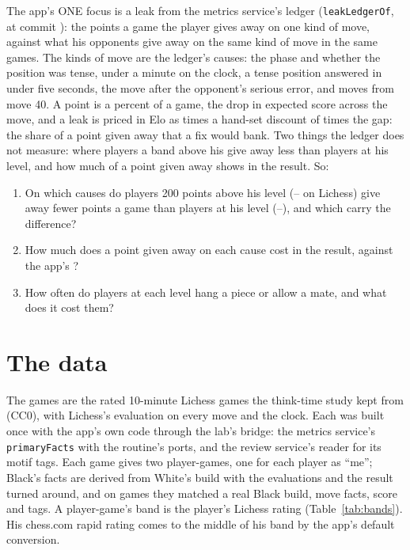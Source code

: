 \documentclass[11pt]{article}
\begin{document}
The app's ONE focus is a leak from the metrics service's ledger (\texttt{leakLedgerOf}, at commit
\texttt{\AppCommit}): the points a game the player gives away on one kind of move, against what his
opponents give away on the same kind of move in the same games. The kinds of move are the ledger's
\Causes{} causes: the phase and whether the position was tense, under a minute on the clock, a
tense position answered in under five seconds, the move after the opponent's serious error, and
moves from move 40. A point is a percent of a game, the drop in expected score across the move,
and a leak is priced in Elo as \EloPerPoint{} times a hand-set discount of \Discount{} times the
gap: the share of a point given away that a fix would bank. Two things the ledger does not
measure: where players a band above his give away less than players at his level, and how much of
a point given away shows in the result. So:
\begin{enumerate}[nosep]
\item On which causes do players 200 points above his level (\AboveLo--\AboveHi{} on Lichess) give
away fewer points a game than players at his level (\HisLo--\HisHi), and which carry the difference?
\item How much does a point given away on each cause cost in the result, against the app's
\Discount?
\item How often do players at each level hang a piece or allow a mate, and what does it cost them?
\end{enumerate}

\section{The data}

The games are the \GamesBuilt{} rated 10-minute Lichess games the think-time study kept from
\Month{} (CC0), with Lichess's evaluation on every move and the clock. Each was built once with the
app's own code through the lab's bridge: the metrics service's \texttt{primaryFacts} with the
routine's ports, and the review service's reader for its motif tags. Each game gives two
player-games, one for each player as ``me''; Black's facts are derived from White's build with the
evaluations and the result turned around, and on \BlackChecked{} games they matched a real Black
build, move facts, score and tags. A player-game's band is the player's Lichess rating
(Table~\ref{tab:bands}). His chess.com rapid rating comes to the middle of his band by the app's
default conversion.
\end{document}
